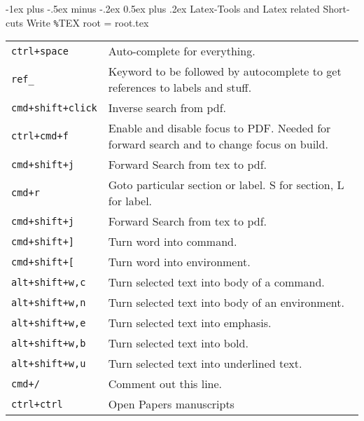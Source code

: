 \documentclass[12pt,landscape]{article}
\makeatletter
\renewcommand{\section}{\@startsection{section}{1}{0mm}%
                                {-1ex plus -.5ex minus -.2ex}%
                                {0.5ex plus .2ex}%
                                {\normalfont\large\bfseries}}
\makeatother
\begin{document}
\begin{multicols}{2}
\section{Latex-Tools and Latex related Short-cuts}
Write \verb!%!TEX root = root.tex
\begin{tabular}{p{1.1in}  p{3in}}
\verb!ctrl+space!       & Auto-complete for everything. \\
\verb!ref_!             & Keyword to be followed by autocomplete to get references to labels and stuff. \\
\verb!cmd+shift+click!  & Inverse search from pdf. \\
\verb!ctrl+cmd+f!       & Enable and disable focus to PDF. Needed for forward search and to change focus on build. \\
\verb!cmd+shift+j!      & Forward Search from tex to pdf. \\
\verb!cmd+r!            & Goto particular section or label. S for section, L for label.\\
\verb!cmd+shift+j!      & Forward Search from tex to pdf. \\
\verb!cmd+shift+]!      & Turn word into command. \\
\verb!cmd+shift+[!      & Turn word into environment. \\
\verb!alt+shift+w,c!    & Turn selected text into body of a command. \\
\verb!alt+shift+w,n!    & Turn selected text into body of an environment. \\
\verb!alt+shift+w,e!    & Turn selected text into emphasis. \\
\verb!alt+shift+w,b!    & Turn selected text into bold. \\
\verb!alt+shift+w,u!    & Turn selected text into underlined text. \\
\verb!cmd+/!            & Comment out this line. \\
\verb!ctrl+ctrl!        & Open Papers manuscripts
\end{tabular}
\end{multicols}
\newpage
\end{document}
